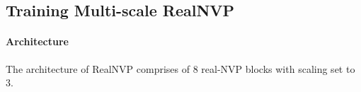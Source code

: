 
\subsection{Training Multi-scale RealNVP}
\paragraph{Architecture}
The architecture of RealNVP comprises of 8 real-NVP blocks with scaling set to $3$.

